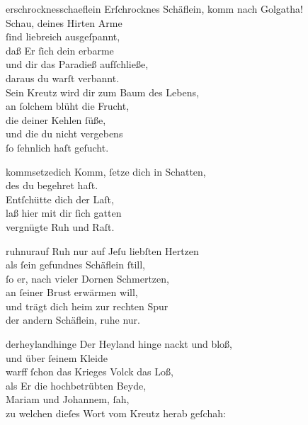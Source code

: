 \documentclass[tocstyle=ref-genre]{ees}
\begin{document}
{\begin{movement}{erschrocknesschaeflein}
  Erſchrocknes Schäflein, komm nach Golgatha!\\
  Schau, deines Hirten Arme\\
  ſind liebreich ausgeſpannt,\\
  daß Er ſich dein erbarme\\
  und dir das Paradieß aufſchließe,\\
  daraus du warſt verbannt.\\
  Sein Kreutz wird dir zum Baum des Lebens,\\
  an ſolchem blüht die Frucht,\\
  die deiner Kehlen ſüße,\\
  und die du nicht vergebens\\
  ſo ſehnlich haſt geſucht.
\end{movement}

\begin{movement}{kommsetzedich}
  Komm, ſetze dich in Schatten,\\
  des du begehret haſt.\\
  Entſchütte dich der Laſt,\\
  laß hier mit dir ſich gatten\\
  vergnügte Ruh und Raſt.
\end{movement}

\enlargethispage\baselineskip
\begin{movement}{ruhnurauf}
  \voice[Coro]
  Ruh nur auf Jeſu liebſten Hertzen\\
  als ſein gefundnes Schäflein ſtill,\\
  ſo er, nach vieler Dornen Schmertzen,\\
  an ſeiner Brust erwärmen will,\\
  und trägt dich heim zur rechten Spur\\
  der andern Schäflein, ruhe nur.
\end{movement}

\begin{movement}{derheylandhinge}
  Der Heyland hinge nackt und bloß,\\
  und über ſeinem Kleide\\
  warff ſchon das Krieges Volck das Loß,\\
  als Er die hochbetrübten Beyde,\\
  Mariam und Johannem, ſah,\\
  zu welchen dieſes Wort vom Kreutz herab geſchah:


\end{movement}}
\end{document}
